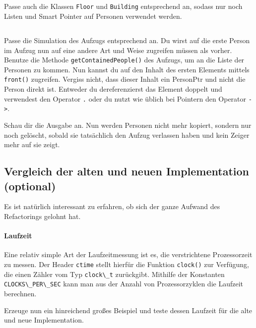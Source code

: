 \subsection{}
Passe auch die Klassen \lstinline{Floor} und \lstinline{Building} entsprechend an, sodass nur noch Listen und Smart Pointer auf Personen verwendet werden.

\subsection{}
Passe die Simulation des Aufzugs entsprechend an.
Du wirst auf die erste Person im Aufzug nun auf eine andere Art und Weise zugreifen müssen als vorher.
Benutze die Methode \lstinline{getContainedPeople()} des Aufzugs, um an die Liste der Personen zu kommen.
Nun kannst du auf den Inhalt des ersten Elements mittels \lstinline{front()} zugreifen.
Vergiss nicht, dass dieser Inhalt ein PersonPtr und nicht die Person direkt ist.
Entweder du dereferenzierst das Element doppelt und verwendest den Operator \lstinline{.} oder du nutzt wie üblich bei Pointern den Operator \lstinline{->}.

Schau dir die Ausgabe an.
Nun werden Personen nicht mehr kopiert, sondern nur noch gelöscht, sobald sie tatsächlich den Aufzug verlassen haben und kein Zeiger mehr auf sie zeigt.

\subsection{Vergleich der alten und neuen Implementation (optional)}

Es ist natürlich interessant zu erfahren, ob sich der ganze Aufwand des Refactorings gelohnt hat.

\paragraph{Laufzeit}
Eine relativ simple Art der Laufzeitmessung ist es, die verstrichtene Prozessorzeit zu messen.
Der Header \lstinline{ctime} stellt hierfür die Funktion \lstinline{clock()} zur Verfügung, die einen Zähler vom Typ \lstinline{clock\_t} zurückgibt.
Mithilfe der Konstanten \lstinline{CLOCKS\_PER\_SEC} kann man aus der Anzahl von Prozessorzyklen die Laufzeit berechnen.

Erzeuge nun ein hinreichend großes Beispiel und teste dessen Laufzeit für die alte und neue Implementation.



